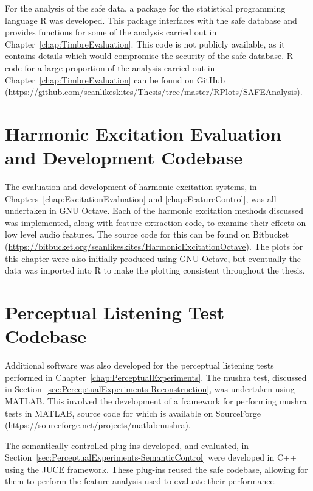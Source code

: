 \begin{appendices}
		For the analysis of the \acrshort{safe} data, a package for the statistical programming language R was
		developed. This package interfaces with the \acrshort{safe} database and provides functions for some of the
		analysis carried out in Chapter~\ref{chap:TimbreEvaluation}. This code is not publicly available, as it
		contains details which would compromise the security of the \acrshort{safe} database. R code for a large
		proportion of the analysis carried out in Chapter~\ref{chap:TimbreEvaluation} can be found on GitHub
		(\href{https://github.com/seanlikeskites/Thesis/tree/master/RPlots/SAFEAnalysis}
		{https://github.com/seanlikeskites/Thesis/tree/master/RPlots/SAFEAnalysis}).

	\section{Harmonic Excitation Evaluation and Development Codebase}
		The evaluation and development of harmonic excitation systems, in Chapters~\ref{chap:ExcitationEvaluation}
		and \ref{chap:FeatureControl}, was all undertaken in GNU Octave. Each of the harmonic excitation methods
		discussed was implemented, along with feature extraction code, to examine their effects on low level audio
		features. The source code for this can be found on Bitbucket
		(\href{https://bitbucket.org/seanlikeskites/HarmonicExcitationOctave}
		{https://bitbucket.org/seanlikeskites/HarmonicExcitationOctave}). The plots for this chapter were also
		initially produced using GNU Octave, but eventually the data was imported into R to make the plotting
		consistent throughout the thesis.

	\section{Perceptual Listening Test Codebase}
		Additional software was also developed for the perceptual listening tests performed in
		Chapter~\ref{chap:PerceptualExperiments}. The \acrshort{mushra} test, discussed in
		Section~\ref{sec:PerceptualExperiments-Reconstruction}, was undertaken using MATLAB. This involved the
		development of a framework for performing \acrshort{mushra} tests in MATLAB, source code for which is
		available on SourceForge
		(\href{https://sourceforge.net/projects/matlabmushra}{https://sourceforge.net/projects/matlabmushra}).

		The semantically controlled plug-ins developed, and evaluated, in
		Section~\ref{sec:PerceptualExperiments-SemanticControl} were developed in C++ using the JUCE framework.
		These plug-ins reused the \acrshort{safe} codebase, allowing for them to perform the feature analysis used
		to evaluate their performance.


\end{appendices}
